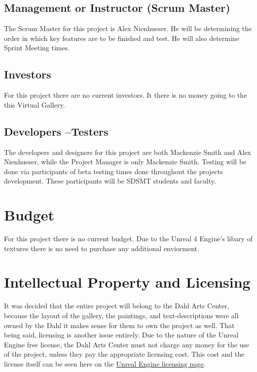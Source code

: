 \subsection{Management or Instructor (Scrum Master)}
The Scrum Master for this project is Alex Nienhueser. He will be determining the order in which key features are to be finished and test. He will also determine Sprint Meeting times. 


\subsection{Investors}
For this project there are no current investors. It there is no money going to the this Virtual Gallery.


\subsection{Developers --Testers}
The developers and designers for this project are both Mackenzie Smith and Alex Nienhueser, while the Project Manager is only Mackenzie Smith. Testing will be done via participants of beta testing times done throughout the projects development. These participants will be SDSMT students and faculty. 

\section{Budget}
For this project there is no current budget. Due to the Unreal 4 Engine's libary of textures there is no need to purchase any additional enviorment. 

\section{Intellectual Property and Licensing}
It was decided that the entire project will belong to the Dahl Arts Center, because the layout of the gallery, the paintings, and text-descriptions were all owned by the Dahl it makes sense for them to own the project as well.  That being said, licensing is another issue entirely.  Due to the nature of the Unreal Engine free license, the Dahl Arts Center must not charge any money for the use of the project, unless they pay the appropriate licensing cost.  This cost and the license itself can be seen here on the \href{https://www.unrealengine.com/previous-versions/udk-licensing-resources}{Unreal Engine licensing page}.

